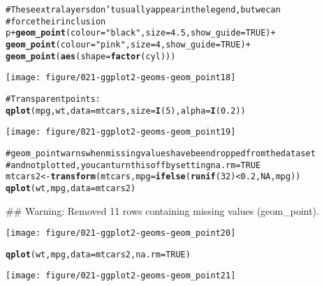\documentclass[a4paper,titlepage]{tufte-handout}\usepackage{graphicx, color}
\makeatletter
\def\maxwidth{ %
  \ifdim\Gin@nat@width>\linewidth
    \linewidth
  \else
    \Gin@nat@width
  \fi
}
\newcommand{\hlfunctioncall}[1]{\textcolor[rgb]{0.501960784313725,0,0.329411764705882}{\textbf{#1}}}%
\newcommand{\hlstring}[1]{\textcolor[rgb]{0.6,0.6,1}{#1}}%
\newcommand{\hlcomment}[1]{\textcolor[rgb]{0.180392156862745,0.6,0.341176470588235}{#1}}%
\newenvironment{kframe}{%
 \def\at@end@of@kframe{}%
 \ifinner\ifhmode%
  \def\at@end@of@kframe{\end{minipage}}%
  \begin{minipage}{\columnwidth}%
 \fi\fi%
 \def\FrameCommand##1{\hskip\@totalleftmargin \hskip-\fboxsep
 \colorbox{shadecolor}{##1}\hskip-\fboxsep
     \hskip-\linewidth \hskip-\@totalleftmargin \hskip\columnwidth}%
 \MakeFramed {\advance\hsize-\width
   \@totalleftmargin\z@ \linewidth\hsize
   \@setminipage}}%
 {\par\unskip\endMakeFramed%
 \at@end@of@kframe}
\newenvironment{knitrout}{}{} %
\makeatother
\begin{document}
\begin{knitrout}
\begin{kframe}
\begin{alltt}
\hlcomment{# These extra layers don't usually appear in the legend, but we can}
\hlcomment{# force their inclusion}
p + \hlfunctioncall{geom_point}(colour=\hlstring{"black"}, size = 4.5, show_guide = TRUE) +
  \hlfunctioncall{geom_point}(colour=\hlstring{"pink"}, size = 4, show_guide = TRUE) +
  \hlfunctioncall{geom_point}(\hlfunctioncall{aes}(shape = \hlfunctioncall{factor}(cyl)))
\end{alltt}
\end{kframe}
\texttt{[image: figure/021-ggplot2-geoms-geom\_point18]} 
\begin{kframe}\begin{alltt}

\hlcomment{# Transparent points:}
\hlfunctioncall{qplot}(mpg, wt, data = mtcars, size = \hlfunctioncall{I}(5), alpha = \hlfunctioncall{I}(0.2))
\end{alltt}
\end{kframe}
\texttt{[image: figure/021-ggplot2-geoms-geom\_point19]} 
\begin{kframe}\begin{alltt}

\hlcomment{# geom_point warns when missing values have been dropped from the data set}
\hlcomment{# and not plotted, you can turn this off by setting na.rm = TRUE}
mtcars2 <- \hlfunctioncall{transform}(mtcars, mpg = \hlfunctioncall{ifelse}(\hlfunctioncall{runif}(32) < 0.2, NA, mpg))
\hlfunctioncall{qplot}(wt, mpg, data = mtcars2)
\end{alltt}


{\ttfamily\noindent\textcolor{warningcolor}{\#\# Warning: Removed 11 rows containing missing values (geom\_point).}}\end{kframe}
\texttt{[image: figure/021-ggplot2-geoms-geom\_point20]} 
\begin{kframe}\begin{alltt}
\hlfunctioncall{qplot}(wt, mpg, data = mtcars2, na.rm = TRUE)
\end{alltt}
\end{kframe}
\texttt{[image: figure/021-ggplot2-geoms-geom\_point21]} 
\begin{kframe}\begin{alltt}


\end{alltt}
\end{kframe}
\end{knitrout}
\end{document}
